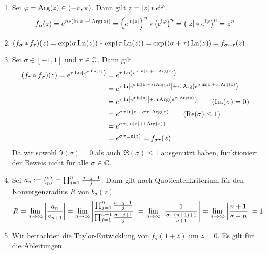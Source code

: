 \begin{exercisePage}
	\begin{enumerate}[label=(zu \alph*), leftmargin=*]
		\item Sei $\varphi = \operatorname{Arg}(z) \in (-\pi, \pi)$. Dann gilt $z = \left| z \right| * e^{\mathrm{i} \varphi}$. 
		\begin{equation*}
			f_n(z) = e^{n * (\ln\left| z \right| + \mathrm{i} \operatorname{Arg}(z))} = \left( e^{\ln\left| z \right|} \right)^n * \left( e^{\mathrm{i} \varphi} \right)^n = \left( \left| z \right| * e^{\mathrm{i} \varphi} \right)^n = z^n
		\end{equation*}
		\item $(f_\sigma * f_\tau)(z) = \exp(\sigma \operatorname{Ln}(z)) * \exp(\tau \operatorname{Ln}(z)) = \exp((\sigma + \tau) \operatorname{Ln}(z)) = f_{\sigma + \tau}(z)$
		\item Sei $\sigma \in [-1,1]$ und $\tau \in \mathbb{C}$. Dann gilt
		\begin{align*}
			(f_\tau \circ f_\sigma)(z) = e^{\tau \Ln\brackets{e^{\sigma \Ln(z)}}} 
			&= e^{\tau \Ln\brackets{e^{\sigma \ln\abs{z} + \sigma \i \Arg(z)}}} \\
			&= e^{\tau \ln\abs{e^{\sigma \ln\abs{z} + \sigma \i \Arg(z)}} + \tau \i \Arg\brackets{e^{\sigma \ln\abs{z} + \sigma \i \Arg(z)}}} \\
			&= e^{\tau \ln\abs{e^{\sigma \ln\abs{z}}} + \tau \i \Arg\brackets{e^{\sigma \i \Arg(z)}}} \tag{$\Im(\sigma) = 0$}\\
			&= e^{\sigma \tau \ln\abs{z} + \sigma \tau \i \Arg(z)} \tag{$\Re(\sigma) \le 1$}\\
			&= e^{\sigma \tau \brackets{\ln\abs{z} + \i \Arg(z)}} \\
			&= e^{\sigma \tau \Ln(z)} 
			= f_{\sigma \tau}(z)
		\end{align*}
		Da wir sowohl $\Im(\sigma) = 0$ als auch $\Re(\sigma) \le 1$ ausgenutzt haben, funktioniert der Beweis nicht für alle $\sigma \in \mathbb{C}$.
		\item Sei $a_n \mathrel{:=} \binom{\sigma}{n} = \prod_{j=1}^{n} \frac{\sigma - j + 1}{j}$. Dann gilt nach Quotientenkriterium für den Konvergenzradius $R$ von $b_\sigma(z)$
		\begin{equation*}
			R = \lim_{n \to \infty} \left| \frac{a_n}{a_{n+1}} \right| = \lim_{n \to \infty} \left| \frac{\prod_{j=1}^{n} \frac{\sigma - j + 1}{j}}{\prod_{j=1}^{n+1} \frac{\sigma - j + 1}{j}} \right| 
			= \lim_{n \to \infty} \left| \frac{1}{\frac{\sigma -(n + 1) + 1}{n+1}} \right|
			= \lim_{n \to \infty} \left| \frac{n+1}{\sigma - n} \right| = 1
		\end{equation*}
		\item Wir betrachten die Taylor-Entwicklung von $f_\sigma(1+z)$ um $z=0$. Es gilt für die Ableitungen
		\begin{equation*}

\end{equation*}
\end{enumerate}
\end{exercisePage}
